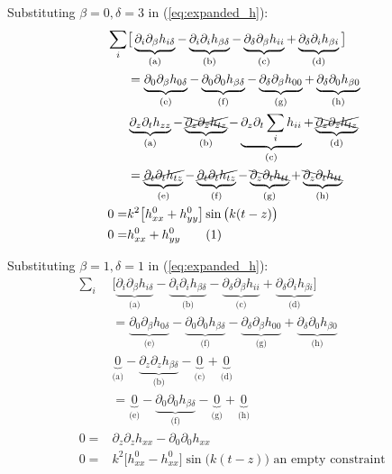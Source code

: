 \documentclass[]{article}
\newcommand\numberthis{\addtocounter{equation}{1}\tag{\theequation}}
\begin{document}
Substituting $\beta=0,\delta=3$ in (\ref{eq:expanded_h}):
\begin{align*}
	\sum_i&\big[\underbrace{\partial_i\partial_\beta h_{i\delta}}_\text{(a)} - \underbrace{\partial_i\partial_i h_{\beta\delta}}_\text{(b)} -  \underbrace{\partial_\delta\partial_\beta h_{ii}}_\text{(c)} + \underbrace{\partial_\delta\partial_i h_{\beta i}}_\text{(d)}\big]\\
	&=\underbrace{\partial_0\partial_\beta h_{0\delta}}_\text{(e)} - \underbrace{\partial_0\partial_0 h_{\beta\delta}}_\text{(f)} -  \underbrace{\partial_\delta\partial_\beta h_{00}}_\text{(g)} + \underbrace{\partial_\delta\partial_0 h_{\beta 0}}_\text{(h)}\\
	&\underbrace{\partial_z\partial_t h_{zz}}_\text{(a)} - \underbrace{\xcancel{\partial_z\partial_z h_{tz}}}_\text{(b)} -  \underbrace{\partial_z\partial_t \sum_i h_{ii}}_\text{(c)} + \underbrace{\xcancel{\partial_z\partial_z h_{tz}}}_\text{(d)}\\
	&=\underbrace{\cancel{\partial_t\partial_t h_{tz}}}_\text{(e)} - \underbrace{\cancel{\partial_t\partial_t h_{tz}}}_\text{(f)} -  \underbrace{\bcancel{\partial_z\partial_t h_{tt}}}_\text{(g)} + \underbrace{\bcancel{\partial_z\partial_t h_{tt}}}_\text{(h)}\\
	0=&k^2 \big[h^0_{xx}+h^0_{yy}\big] \sin\big(k(t-z)\big)\\
	0=&h^0_{xx}+h^0_{yy} \numberthis \label{eq:con:03}
\end{align*}

Substituting $\beta=1,\delta=1$ in (\ref{eq:expanded_h}):
\begin{align*}
	\sum_i&\big[\underbrace{\partial_i\partial_\beta h_{i\delta}}_\text{(a)} - \underbrace{\partial_i\partial_i h_{\beta\delta}}_\text{(b)} -  \underbrace{\partial_\delta\partial_\beta h_{ii}}_\text{(c)} + \underbrace{\partial_\delta\partial_i h_{\beta i}}_\text{(d)}\big]\\
	&=\underbrace{\partial_0\partial_\beta h_{0\delta}}_\text{(e)} - \underbrace{\partial_0\partial_0 h_{\beta\delta}}_\text{(f)} -  \underbrace{\partial_\delta\partial_\beta h_{00}}_\text{(g)} + \underbrace{\partial_\delta\partial_0 h_{\beta 0}}_\text{(h)}\\
	&\underbrace{0}_\text{(a)} - \underbrace{\partial_z\partial_z h_{\beta\delta}}_\text{(b)} -  \underbrace{0}_\text{(c)} + \underbrace{0}_\text{(d)}\\
	&=\underbrace{0}_\text{(e)} - \underbrace{\partial_0\partial_0 h_{\beta\delta}}_\text{(f)} -  \underbrace{0}_\text{(g)} + \underbrace{0}_\text{(h)}\\
	0=&\partial_z\partial_z h_{xx}-\partial_0\partial_0 h_{xx}\\
	0=&k^2 \big[ h^0_{xx} - h^0_{xx}\big] \sin\big(k(t-z)\big) \text{ an empty constraint }
\end{align*}
\end{document}
